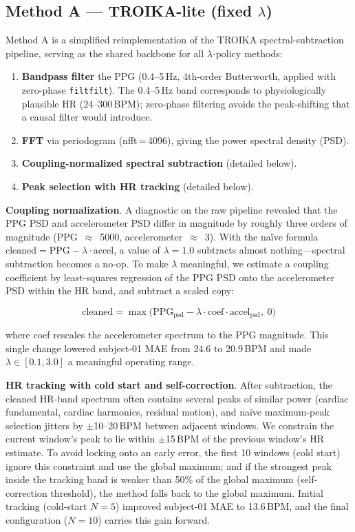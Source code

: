 \documentclass[sigconf,nonacm,11pt]{acmart}
\begin{document}
\subsection{Method A --- TROIKA-lite (fixed $\lambda$)}

Method A is a simplified reimplementation of the TROIKA spectral-subtraction pipeline, serving as the shared backbone for all $\lambda$-policy methods:

\begin{enumerate}
\item \textbf{Bandpass filter} the PPG (0.4--5\,Hz, 4th-order Butterworth, applied with zero-phase \texttt{filtfilt}). The 0.4--5\,Hz band corresponds to physiologically plausible HR (24--300\,BPM); zero-phase filtering avoids the peak-shifting that a causal filter would introduce.
\item \textbf{FFT} via periodogram (nfft\,=\,4096), giving the power spectral density (PSD).
\item \textbf{Coupling-normalized spectral subtraction} (detailed below).
\item \textbf{Peak selection with HR tracking} (detailed below).
\end{enumerate}

\textbf{Coupling normalization}. A diagnostic on the raw pipeline revealed that the PPG PSD and accelerometer PSD differ in magnitude by roughly three orders of magnitude (PPG~$\approx$~5000, accelerometer~$\approx$~3). With the na\"ive formula $\text{cleaned} = \text{PPG} - \lambda \cdot \text{accel}$, a value of $\lambda = 1.0$ subtracts almost nothing---spectral subtraction becomes a no-op. To make $\lambda$ meaningful, we estimate a coupling coefficient by least-squares regression of the PPG PSD onto the accelerometer PSD within the HR band, and subtract a scaled copy:

\begin{equation}
\text{cleaned} = \max\!\bigl(\text{PPG}_{\text{psd}} - \lambda \cdot \text{coef} \cdot \text{accel}_{\text{psd}},\ 0\bigr)
\end{equation}

where coef rescales the accelerometer spectrum to the PPG magnitude. This single change lowered subject-01 MAE from 24.6 to 20.9\,BPM and made $\lambda \in [0.1, 3.0]$ a meaningful operating range.

\textbf{HR tracking with cold start and self-correction}. After subtraction, the cleaned HR-band spectrum often contains several peaks of similar power (cardiac fundamental, cardiac harmonics, residual motion), and na\"ive maximum-peak selection jitters by $\pm$10--20\,BPM between adjacent windows. We constrain the current window's peak to lie within $\pm$15\,BPM of the previous window's HR estimate. To avoid locking onto an early error, the first 10 windows (cold start) ignore this constraint and use the global maximum; and if the strongest peak inside the tracking band is weaker than 50\% of the global maximum (self-correction threshold), the method falls back to the global maximum. Initial tracking (cold-start $N = 5$) improved subject-01 MAE to 13.6\,BPM, and the final configuration ($N = 10$) carries this gain forward.
\end{document}
